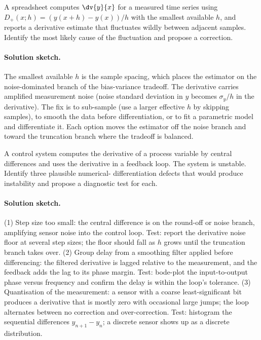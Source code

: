 \begin{exercise}
A spreadsheet computes $\dv{y}{x}$ for a measured time series
using $D_{+}(x; h) = (y(x + h) - y(x))/h$ with the smallest
available $h$, and reports a derivative estimate that fluctuates
wildly between adjacent samples. Identify the most likely cause
of the fluctuation and propose a correction.
\end{exercise}

\paragraph{Solution sketch.}
The smallest available $h$ is the sample spacing, which places
the estimator on the noise-dominated branch of the bias-variance
tradeoff. The derivative carries amplified measurement noise
(noise standard deviation in $y$ becomes $\sigma_{y} / h$ in the
derivative). The fix is to sub-sample (use a larger effective
$h$ by skipping samples), to smooth the data before
differentiation, or to fit a parametric model and differentiate
it. Each option moves the estimator off the noise branch and
toward the truncation branch where the tradeoff is balanced.

\begin{exercise}
A control system computes the derivative of a process variable
by central differences and uses the derivative in a feedback
loop. The system is unstable. Identify three plausible numerical-
differentiation defects that would produce instability and
propose a diagnostic test for each.
\end{exercise}

\paragraph{Solution sketch.}
(1) Step size too small: the central difference is on the
round-off or noise branch, amplifying sensor noise into the
control loop. Test: report the derivative noise floor at several
step sizes; the floor should fall as $h$ grows until the
truncation branch takes over. (2) Group delay from a smoothing
filter applied before differencing: the filtered derivative is
lagged relative to the measurement, and the feedback adds the
lag to its phase margin. Test: bode-plot the input-to-output
phase versus frequency and confirm the delay is within the
loop's tolerance. (3) Quantisation of the measurement: a sensor
with a coarse least-significant bit produces a derivative that
is mostly zero with occasional large jumps; the loop alternates
between no correction and over-correction. Test: histogram the
sequential differences $y_{n+1} - y_{n}$; a discrete sensor
shows up as a discrete distribution.

